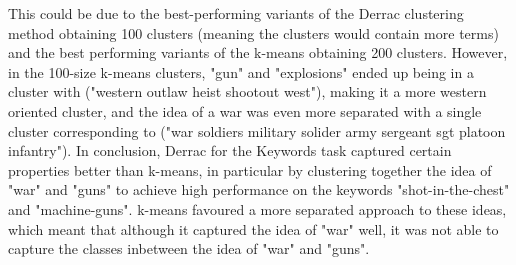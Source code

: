 


This could be due to the best-performing variants of the Derrac clustering method obtaining 100 clusters (meaning the clusters would contain more terms) and the best performing variants of the k-means obtaining 200 clusters. However, in the 100-size k-means clusters, "gun" and "explosions" ended up being in a cluster with ("western outlaw heist shootout west"), making it a more western oriented cluster, and the idea of a war was even more separated with a single cluster corresponding to ("war soldiers military solider army sergeant sgt platoon infantry"). In conclusion, Derrac for the Keywords task captured certain properties better than k-means, in particular by clustering together the idea of "war" and "guns" to achieve high performance on the keywords "shot-in-the-chest" and "machine-guns". k-means favoured a more separated approach to these ideas, which meant that although it captured the idea of "war" well, it was not able to capture the classes inbetween the idea of "war" and "guns".





